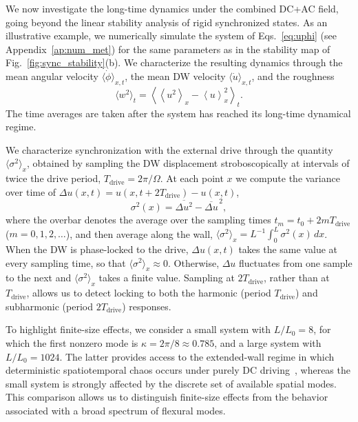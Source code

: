 \documentclass[prb,aps,twocolumn,superscriptaddress,floatfix]{revtex4-2}
\begin{document}
We now investigate the long-time dynamics under the combined DC+AC field, going beyond the linear stability analysis of rigid synchronized states. As an illustrative example, we numerically simulate the system of Eqs.~\eqref{eq:uphi} (see Appendix~\ref{ap:num_met}) for the same parameters as in the stability map of Fig.~\ref{fig:sync_stability}(b). We characterize the resulting dynamics through the mean angular velocity $\langle\dot\phi\rangle_{x,t}$, the mean DW velocity $\langle\dot u\rangle_{x,t}$, and the roughness
\begin{equation}
\langle w^2\rangle_t =
\left\langle
\left\langle u^2\right\rangle_x
-\left\langle u\right\rangle_x^2
\right\rangle_t .
\label{eq:roughnessvst}
\end{equation}
The time averages are taken after the system has reached its long-time dynamical regime.

We characterize synchronization with the external drive through the quantity $\langle\sigma^2\rangle_x$, obtained by sampling the DW displacement stroboscopically at intervals of twice the drive period, $T_\text{drive}=2\pi/\Omega$. At each point $x$ we compute the variance over time of $\Delta u(x,t)=u(x,t+2T_\text{drive})-u(x,t)$,
\begin{equation}
  \sigma^2(x)=\overline{\Delta u^{2}}-\overline{\Delta u}^{\,2},
\end{equation}
where the overbar denotes the average over the sampling times $t_m=t_0+2mT_\text{drive}$ ($m=0,1,2,\dots$), and then average along the wall, $\langle\sigma^2\rangle_x=L^{-1}\!\int_0^L\sigma^2(x)\,dx$. When the DW is phase-locked to the drive, $\Delta u(x,t)$ takes the same value at every sampling time, so that $\langle\sigma^2\rangle_x\approx 0$. Otherwise, $\Delta u$ fluctuates from one sample to the next and $\langle\sigma^2\rangle_x$ takes a finite value. Sampling at $2T_\text{drive}$, rather than at $T_\text{drive}$, allows us to detect locking to both the harmonic (period $T_\text{drive}$) and subharmonic (period $2T_\text{drive}$) responses.

To highlight finite-size effects, we consider a small system with $L/L_0=8$, for which the first nonzero mode is $\kappa=2\pi/8\approx 0.785$, and a large system with $L/L_0=1024$. The latter provides access to the extended-wall regime in which deterministic spatiotemporal chaos occurs under purely DC driving~\cite{pusiol2026deterministic}, whereas the small system is strongly affected by the discrete set of available spatial modes. This comparison allows us to distinguish finite-size effects from the behavior associated with a broad spectrum of flexural modes.
\end{document}
